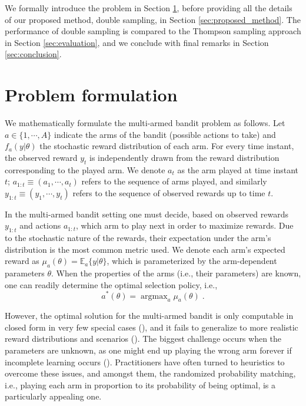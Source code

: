 \documentclass{article}
\newcommand{\ie}{i.e., }
\newcommand{\argmax}{\mathop{\mathrm{argmax}}}
\begin{document}
We formally introduce the problem in Section \ref{sec:problem_formulation}, before providing all the details of our proposed method, double sampling, in Section \ref{sec:proposed_method}. The performance of 
double sampling
is compared to the Thompson sampling approach in Section \ref{sec:evaluation}, and we conclude with final remarks in Section \ref{sec:conclusion}.

\section{Problem formulation}
\label{sec:problem_formulation}

We mathematically formulate the multi-armed bandit problem as follows. Let $a\in\{1,\cdots,A\}$ indicate the arms of the bandit (possible actions to take) and $f_{a}(y|\theta)$ the stochastic reward distribution of each arm. For every time instant, the observed reward $y_t$ is independently drawn from the reward distribution corresponding to the played arm. We denote $a_t$ as the arm played at time instant $t$; $a_{1:t} \equiv (a_1, \cdots , a_t)$ refers to the sequence of arms played, and similarly $y_{1:t} \equiv (y_1, \cdots , y_t)$ refers to the sequence of observed rewards up to time $t$.

In the multi-armed bandit setting one must decide, based on observed rewards $y_{1:t}$ and actions $a_{1:t}$, which arm to play next in order to maximize rewards. Due to the stochastic nature of the rewards, their expectation under the arm's distribution is the most common metric used. We denote each arm's expected reward as $\mu_{a}(\theta)=\mathbb{E}_{a}\{y|\theta\}$, which is parameterized by the arm-dependent parameters $\theta$. When the properties of the arms (\ie their parameters) are known, one can readily determine the optimal selection policy, \ie
		\begin{equation}
		a^*(\theta)=\argmax_{a}\mu_{a}(\theta) \; .
		\end{equation}
		
However, the optimal solution for the multi-armed bandit is only computable in closed form in very few special cases (\cite{j-Bellm1956, j-Gittins1979}), and it fails to generalize to more realistic reward distributions and scenarios (\cite{j-Scott2010}). The biggest challenge occurs when the parameters are unknown, as one might end up playing the wrong arm forever if incomplete learning occurs (\cite{j-Brezzi2000}). Practitioners have often turned to heuristics to overcome these issues, and amongst them, the randomized probability matching, \ie playing each arm in proportion to its probability of being optimal, is a particularly appealing one.
\end{document}
